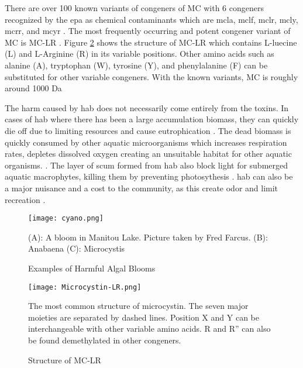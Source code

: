 There are over 100 known variants of congeners of MC with 6 congeners recognized by the \gls{epa} as chemical contaminants which are \gls{mcla}, \gls{mclf}, \gls{mclr}, \gls{mcly}, \gls{mcrr}, and \gls{mcyr} \cite{puddick_modulation_2016}. The most frequently occurring and potent congener variant of MC is MC-LR \cite{rastogi_cyanotoxin-microcystins:_2014}. Figure \ref{fig:structure1} shows the structure of MC-LR which contains L-luecine (L) and L-Arginine (R) in its variable positions. Other amino acids such as alanine (A), tryptophan (W), tyrosine (Y), and phenylalanine (F) can be substituted for other variable congeners. With the known variants, MC is roughly around 1000 Da \cite{dittmann_cyanobacterial_2012}

The harm caused by \gls{hab} does not necessarily come entirely from the toxins. In cases of \gls{hab} where there has been a large accumulation biomass, they can quickly die off due to limiting resources and cause eutrophication \cite{charlton_oxygen_1980}. The dead biomass is quickly consumed by other aquatic microorganisms which increases respiration rates, depletes dissolved oxygen creating an unsuitable habitat for other aquatic organisms.  \cite{anderson_harmful_2002}. The layer of scum formed from \gls{hab} also block light for submerged aquatic macrophytes, killing them by preventing photosythesis \cite{ bucak_modeling_2018}. \gls{hab} can also be a major nuisance and a cost to the community, as this create odor and limit recreation \cite{graham_cyanotoxin_2010, carmichael_health_2016}.


\begin{figure}[!hp]
	\texttt{[image: cyano.png]}
	\caption{Examples of Harmful Algal Blooms}
	\label{fig:cyano}
	\begin{flushleft} 
(A): A bloom in Manitou Lake. Picture taken by Fred Farcus. (B): Anabaena (C): Microcystis
\end{flushleft} 
\end{figure}


\begin{figure}[!hp]
   \texttt{[image: Microcystin-LR.png]}
   \caption{Structure of MC-LR}
   \label{fig:structure1}
   \begin{flushleft}
   The most common structure of microcystin. The seven major moieties are separated by dashed lines. Position X and Y can be interchangeable with other variable amino acids. R and R'' can also be found demethylated in other congeners. 
     \end{flushleft}
 \end{figure}

